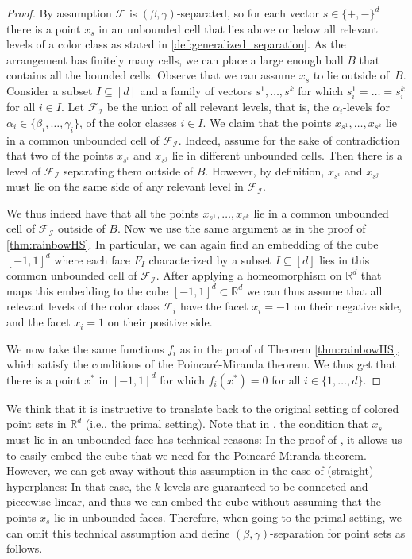 \documentclass[a4paper,UKenglish,cleveref, autoref, thm-restate, nolineno]{socg-lipics-v2021}
\newcommand{\R}{\mathbb{R}}
\begin{document}
\begin{proof}
By assumption $\mathcal{F}$ is $(\beta,\gamma)$-separated, so for each vector $s \in \{+, -\}^d$ there is a point $x_s$ in an unbounded cell that lies above or below all relevant levels of a color class as stated in \cref{def:generalized_separation}. As the arrangement has finitely many cells, we can place a large enough ball $B$ that contains all the bounded cells. Observe that we can assume $x_s$ to lie outside of~$B$. Consider a subset $I\subseteq [d]$ and a family of vectors $s^1,\ldots,s^k$ for which $s_i^1=\ldots =s_i^k$ for all $i\in I$. Let $\mathcal{F_{I}}$ be the union of all relevant levels, that is, the $\alpha_i$-levels for $\alpha_i \in \{\beta_i, \ldots, \gamma_i\}$, of the color classes $i \in I$. We claim that the points $x_{s^1},\ldots,x_{s^k}$ lie in a common unbounded cell of $\mathcal{F_{I}}$. Indeed, assume for the sake of contradiction that two of the points $x_{s^i}$ and $x_{s^j}$ lie in different unbounded cells. Then there is a level of $\mathcal{F_{I}}$ separating them outside of $B$. However, by definition, $x_{s^i}$ and $x_{s^j}$ must lie on the same side of any relevant level in $\mathcal{F_{I}}$.

We thus indeed have that all the points $x_{s^1},\ldots,x_{s^k}$ lie in a common unbounded cell of $\mathcal{F_{I}}$ outside of $B$. 
Now we use the same argument as in the proof of \cref{thm:rainbowHS}.
In particular, we can again find an embedding of the cube $[-1,1]^d$ where each face $F_I$ characterized by a subset $I \subseteq [d]$ 
lies in this common unbounded cell of $\mathcal{F_{I}}$. After applying a homeomorphism on $\mathbb{R}^d$ that maps this embedding to the cube $[-1,1]^d\subset\mathbb{R}^d$ we can thus assume that all relevant levels of the color class $\mathcal{F}_i$ have the facet $x_i=-1$ on their negative side, and the facet $x_i=1$ on their positive side.

We now take the same functions $f_i$ as in the proof of Theorem \ref{thm:rainbowHS}, which satisfy the conditions of the Poincar\'{e}-Miranda theorem.
We thus get that there is a point $x^*$ in $[-1,1]^d$ for which $f_i(x^*)=0$ for all $i\in\{1,\ldots,d\}$.
\end{proof}

We think that it is instructive to translate  back to the original setting of colored point sets in $\R^d$ (i.e., the primal setting). Note that in , the condition that $x_s$ must lie in an unbounded face has technical reasons: In the proof of , it allows us to easily embed the cube that we need for the Poincar\'{e}-Miranda theorem. However, we can get away without this assumption in the case of (straight) hyperplanes: In that case, the $k$-levels are guaranteed to be connected and piecewise linear, and thus we can embed the cube without assuming that the points $x_s$ lie in unbounded faces. Therefore, when going to the primal setting, we can omit this technical assumption and define $(\beta, \gamma)$-separation for point sets as follows.
\end{document}
